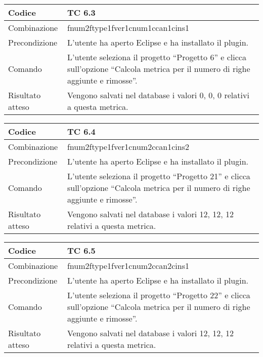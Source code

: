 \begin{table}[ht]
\begin{tabular}{|p{3cm}|p{9cm}|}
\hline
\cellcolor{lightgray}Codice				& TC 6.3								\\
\hline
\cellcolor{lightgray}Combinazione		& fnum2ftype1fver1cnum1ccan1cins1 									\\
\hline
\cellcolor{lightgray}Precondizione		& L'utente ha aperto Eclipse e ha installato il plugin.			\\
\hline
\cellcolor{lightgray}Comando			& L'utente seleziona il progetto ``Progetto 6''  e clicca sull'opzione ``Calcola metrica per il numero di righe aggiunte e rimosse''.	\\
\hline
\cellcolor{lightgray}Risultato atteso	& Vengono salvati nel database i valori 0, 0, 0 relativi a questa metrica.\\
\hline
\end{tabular}
\end{table}

\begin{table}[ht]
\begin{tabular}{|p{3cm}|p{9cm}|}
\hline
\cellcolor{lightgray}Codice				& TC 6.4								\\
\hline
\cellcolor{lightgray}Combinazione		& fnum2ftype1fver1cnum2ccan1cins2								\\
\hline
\cellcolor{lightgray}Precondizione		& L'utente ha aperto Eclipse e ha installato il plugin.				\\
\hline
\cellcolor{lightgray}Comando			& L'utente seleziona il progetto ``Progetto 21''  e clicca sull'opzione ``Calcola metrica per il numero di righe aggiunte e rimosse''.	\\
\hline
\cellcolor{lightgray}Risultato atteso	& Vengono salvati nel database i valori 12, 12, 12 relativi a questa metrica.\\
\hline
\end{tabular}
\end{table}

\begin{table}[ht]
\begin{tabular}{|p{3cm}|p{9cm}|}
\hline
\cellcolor{lightgray}Codice				& TC 6.5								\\
\hline
\cellcolor{lightgray}Combinazione		& fnum2ftype1fver1cnum2ccan2cins1							\\
\hline
\cellcolor{lightgray}Precondizione		& L'utente ha aperto Eclipse e ha installato il plugin.									\\
\hline
\cellcolor{lightgray}Comando			& L'utente seleziona il progetto ``Progetto 22''  e clicca sull'opzione ``Calcola metrica per il numero di righe aggiunte e rimosse''.	\\
\hline
\cellcolor{lightgray}Risultato atteso	& Vengono salvati nel database i valori 12, 12, 12 relativi a questa metrica.\\
\hline
\end{tabular}
\end{table}

